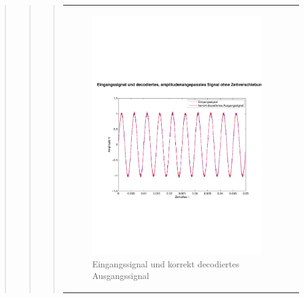 \begin{quote}
\begin{quote}
\begin{quote}
\begin{center}
\begin{tabular}{ll}
                    \begin{minipage}{0.6\textwidth}
                        \begin{figure}[H]
                            \includegraphics[scale=0.4,trim = 0cm 7cm 0cm
                            7.5cm, clip]
                            {./Bilder/sin100_Eingang_vs_korrektDecodiert}
                              \caption{Eingangssignal und korrekt decodiertes
                              Ausgangssignal}
                        \end{figure}
                    \end{minipage}
                
                \end{tabular}
            \end{center}
            
            
            

\end{quote}
\end{quote}
\end{quote}
